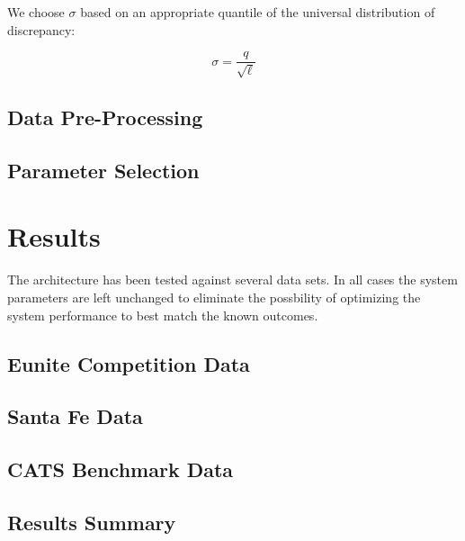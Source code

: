 \documentclass[10pt]{article}
\begin{document}
We choose \( \sigma \) based on an appropriate quantile of the universal distribution of discrepancy:

\begin{equation} \sigma = \frac{q}{\sqrt \ell} \end{equation}

\subsection{Data Pre-Processing}




\subsection{Parameter Selection}


\section{Results}
The architecture has been tested against several data sets.  In all cases the system parameters are left unchanged to eliminate the possbility of optimizing the system performance to best match the known outcomes.

\subsection{Eunite Competition Data}


\subsection{Santa Fe Data}


\subsection{CATS Benchmark Data}


\subsection{Results Summary}
\end{document}
